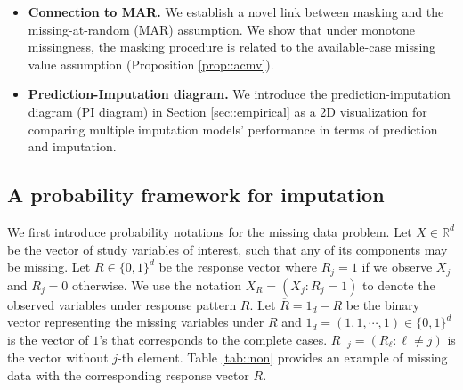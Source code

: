 \documentclass[aos, preprint]{imsart}
\theoremstyle{plain}
\theoremstyle{definition}
\newcommand{\R}{\mbox{$\mathbb{R}$}}
\begin{document}
\begin{itemize}
We introduce a masking likelihood framework (Section \ref{sec::learning}) for training parametric imputation models. We establish its theoretical guarantees, including asymptotic normality of the resulting estimators (Theorem~\ref{thm::MLE}), convergence of gradient ascent (Theorem~\ref{thm::GD}), parameter recovery under MCAR (Theorem \ref{thm::mcar}), and model selection consistency (Theorem \ref{thm::BIC}).
\item {\bf Connection to MAR.} We establish a novel link between masking and the missing-at-random (MAR) assumption. We show that under monotone missingness, the masking procedure is related to the available-case missing value assumption (Proposition \ref{prop::acmv}).
\item {\bf Prediction-Imputation diagram.}
We introduce the prediction-imputation diagram (PI diagram) in Section \ref{sec::empirical}
as a 2D visualization for comparing multiple imputation models' performance in terms of prediction and imputation. 

\end{itemize}


\subsection{A probability framework for imputation}

We first introduce  probability notations for the missing data problem.
Let $X\in\R^d$ be the 
vector of study variables of interest, such that any of its components may be missing.
Let $R\in\{0,1\}^d$ be the response vector
where $R_j=1$ if we observe $X_j$ and $R_j=0$ otherwise.
We use the notation $X_R = (X_j: R_j=1)$
to denote the observed variables under response pattern $R$. 
Let $\overline{R} = 1_d-R$ be the binary vector representing
the missing variables under $R$ and $1_d = (1,1,\cdots,1)\in \{0,1\}^d$  is the vector of $1$'s that corresponds
to the complete cases.  $R_{-j} = (R_\ell: \ell \neq j)$ is the vector without $j$-th element.
Table \ref{tab::non} provides an example of missing data with the corresponding response vector $R$.
\end{document}
